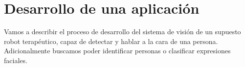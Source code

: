 \section{Desarrollo de una aplicación}


Vamos a describir el proceso de desarrollo del sistema de visión de un supuesto robot terapéutico, capaz de detectar y hablar a la cara de una persona. Adicionalmente buscamos poder identificar personas o clasificar expresiones faciales.
